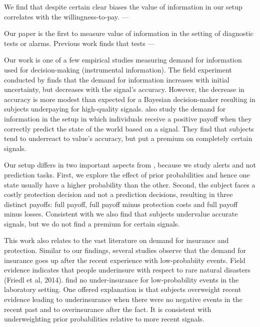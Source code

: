 \documentclass[12pt,a4paper]{article}
\begin{document}
We find that despite certain clear biases the value of information in our setup correlates with the willingness-to-pay. ---

Our paper is the first to measure value of information in the setting of diagnostic tests or alarms. Previous work finds that tests ---

Our work is one of a few empirical studies measuring demand for information used for decision-making (instrumental information). The field experiment conducted by \citep{hoffman_how_2016} finds that the demand for information increases with initial uncertainty, but decreases with the signal's accuracy. However, the decrease in accuracy is more modest than expected for a Bayesian decision-maker resulting in subjects underpaying for high-quality signals.  \citet{ambuehl_belief_2018} also study the demand for information in the setup in which individuals receive a positive payoff when they correctly predict the state of the world based on a signal. They find that subjects tend to underreact to value's accuracy, but put a premium on completely certain signals. 

Our setup differs in two important aspects from \citet{ambuehl_belief_2018}, because we study alerts and not prediction tasks. First, we explore the effect of prior probabilities and hence one state usually have a higher probability than the other. Second, the subject faces a costly protection decision and not a prediction decisions, resulting in three distinct payoffs: full payoff, full payoff minus protection costs and full payoff minus losses. Consistent with \citet{ambuehl_belief_2018} we also find that subjects undervalue accurate signals, but we do not find a premium for certain signals. 

This work also relates to the vast literature on demand for insurance and protection. Similar to our findings, several studies observe that the demand for insurance goes up after the recent experience with low-probabiity events. Field evidence indicates that people underinsure with respect to rare natural disasters (Friedl et al, 2014). \citet{laury_insurance_2009} find no under-insurance for low-probability events in the laboratory setting. One offered explanation \citep{volkman-wise_representativeness_2015} is that subjects overweight recent evidence leading to underinsurance when there were no negative events in the recent past and to overinsurance after the fact. It is consistent with underweighting prior probabilities relative to more recent signals. 
\end{document}
